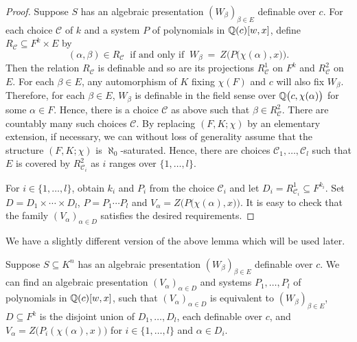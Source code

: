 \begin{proof}
Suppose $S$ has an  algebraic presentation $( W_\beta)_{ \beta \in E}$ definable over $c$. For each choice $\mathscr{C}$ of $k$ and a system $P$ of polynomials in $\mathbb{Q}(c)[w,x]$, define $R_{\mathscr{C}} \subseteq F^k \times E$ by  
$$(\alpha, \beta) \in R_{\mathscr{C}}\ \text{ if and only if }\ W_\beta \ =\  Z\Big( P\big(\chi(\alpha),x\big)\Big).$$
Then the relation $R_{\mathscr{C}}$ is definable and so are its projections $R^1_{\mathscr{C}}$ on $F^k$  and $R^2_{\mathscr{C}}$ on $E$. For each $\beta \in E $, any automorphism of $K$ fixing $\chi(F)$ and $c$ will also fix $W_\beta$. 
Therefore, for each $\beta \in E$, $W_\beta$ is definable  in the field sense over $\mathbb{Q}\big(c, \chi( \alpha)\big)$ for some $\alpha \in F$. Hence, there is a choice $\mathscr{C}$ as above such that $\beta \in R^2_{\mathscr{C}}$. There are countably many such choices $\mathscr{C}$.
By replacing $(F,K;\chi)$ by an elementary extension, if necessary, we can without loss of generality assume that the structure $(F,K;\chi)$ is $\aleph_0$-saturated.
Hence, there are choices $\mathscr{C}_1, \ldots, \mathscr{C}_l$ such that  $E$ is covered by $R^2_{\mathscr{C}_i}$ as $i$ ranges over $\{1, \ldots, l\}$. 

For $i \in \{1, \ldots, l\}$, obtain $k_i$ and $P_i$ from  the choice $\mathscr{C}_i$ and let $D_i= R^1_{\mathscr{C}_i} \subseteq F^{k_i}$. 
Set $D = D_1 \times \cdots \times D_l$, $P= P_1\cdots P_l$ and $V_\alpha = Z\Big( P\big(\chi(\alpha),x\big)\Big)$. It is easy to check that the family $(V_\alpha)_{ \alpha \in D}$ satisfies the desired requirements.
\end{proof}

\noindent
We have a slightly different version of the above lemma which will be used later.

\begin{lem}  \label{APsimple2}
Suppose $ S \subseteq K^n$ has an algebraic presentation $( W_\beta)_{ \beta \in E}$ definable over $c$. We can find an algebraic presentation $(V_\alpha)_{ \alpha \in D}$ and systems $P_1, \ldots, P_l$ of polynomials in $\mathbb{Q}(c)[w,x]$, such that  $(V_\alpha)_{ \alpha \in D}$ is equivalent to $( W_\beta)_{ \beta \in E}$, $D\subseteq F^k$ is the disjoint union of $D_1, \ldots, D_l$, each definable over $c$, and $ V_\alpha = Z\big( P_i(\chi(\alpha),x)\big)$ for $i\in \{ 1,\ldots, l\}$ and $\alpha \in D_i$. 
\end{lem}


